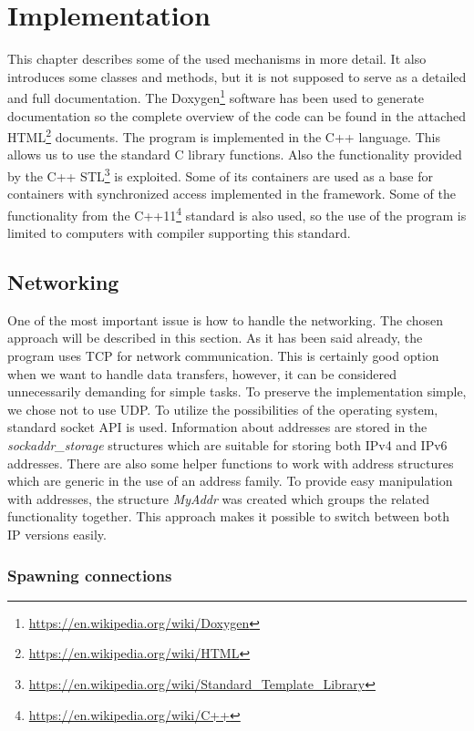 \chapter{Implementation}\label{implementation}

This chapter describes some of the used mechanisms in more detail. It
also introduces some classes and methods, but it is not supposed to
serve as a detailed and full documentation. The
Doxygen\footnote{\url{https://en.wikipedia.org/wiki/Doxygen}} software
has been used to generate documentation so the complete overview of the
code can be found in the attached
HTML\footnote{\url{https://en.wikipedia.org/wiki/HTML}} documents. The
program is implemented in the C++ language. This allows us to use the
standard C library functions. Also the functionality provided by the C++
STL\footnote{\url{https://en.wikipedia.org/wiki/Standard\_Template\_Library}}
is exploited. Some of its containers are used as a base for containers
with synchronized access implemented in the framework. Some of the
functionality from the
C++11\footnote{\url{https://en.wikipedia.org/wiki/C++}} standard is also
used, so the use of the program is limited to computers with compiler
supporting this standard.

\section{Networking}\label{networking}

One of the most important issue is how to handle the networking. The
chosen approach will be described in this section. As it has been said
already, the program uses TCP for network communication. This is
certainly good option when we want to handle data transfers, however, it
can be considered unnecessarily demanding for simple tasks. To preserve
the implementation simple, we chose not to use UDP. To utilize the
possibilities of the operating system, standard socket API is used.
Information about addresses are stored in the \textit{sockaddr\_storage}
structures which are suitable for storing both IPv4 and IPv6 addresses.
There are also some helper functions to work with address structures
which are generic in the use of an address family. To provide easy
manipulation with addresses, the structure \textit{MyAddr} was created
which groups the related functionality together. This approach makes it
possible to switch between both IP versions easily.

\subsection{Spawning connections}\label{spawning-connections}

